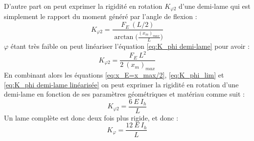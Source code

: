 D'autre part on peut exprimer la rigidité en rotation $K_{\varphi 2}$ d'une demi-lame qui est simplement le rapport du moment généré par l'angle de flexion :
\begin{equation}
		K_{\varphi 2} =  \frac{F_E\ (L/2)}{\arctan \biggl( \frac{(x_m)_{max}}{L} \biggr)}
\label{eq:K_phi demi-lame}
\end{equation}
$\varphi$ étant très faible on peut linéariser l'équation  \ref{eq:K_phi demi-lame} pour avoir :
\begin{equation}
		K_{\varphi 2} =  \frac{F_E\ L^2}{2\ (x_m)_{max}}
\label{eq:K_phi demi-lame linéarisée}
\end{equation}
En combinant alors les équations \ref{eq:x_E=x_max/2}, \ref{eq:K_phi_lim} et \ref{eq:K_phi demi-lame linéarisée} on peut exprimer la rigidité en rotation d'une demi-lame en fonction de ses paramètres géométriques et matériau comme suit :
\begin{equation}
		K_{\varphi 2} = \frac{6\ E\ I_h}{L}
		\label{eq:K_phi demi-lame final}
\end{equation}
Un lame complète est donc deux fois plus rigide, et donc :
\begin{equation}
		K_{\varphi} = \frac{12\ E\ I_h}{L}
		\label{eq:K_phi lame entière final}
\end{equation}

